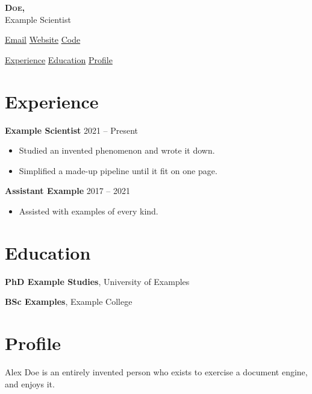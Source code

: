 \documentclass{article}
\begin{document}
\begin{center}
  {\sffamily\scshape\bfseries\Huge {} Doe, }\\
  Example Scientist

  \href{mailto:alex@example.org}{Email} \middot
  \href{https://example.org/alex}{Website} \middot
  \href{https://example.org/code}{Code}

  \href{#experience}{Experience} \middot
  \href{#education}{Education} \middot
  \href{#profile}{Profile}
\end{center}

\section*{Experience}

\textbf{Example Scientist} \hfill 2021 -- Present\par
{}
\begin{itemize}
  \item Studied an invented phenomenon and wrote it down.
  \item Simplified a made-up pipeline until it fit on one page.
\end{itemize}

\textbf{Assistant Example} \hfill 2017 -- 2021\par
{}
\begin{itemize}
  \item Assisted with examples of every kind.
\end{itemize}

\section*{Education}

\textbf{PhD Example Studies}, University of Examples\par
{}

\textbf{BSc Examples}, Example College

\section*{Profile}

Alex Doe is an entirely invented person who exists to exercise a
document engine, and enjoys it.
\end{document}
